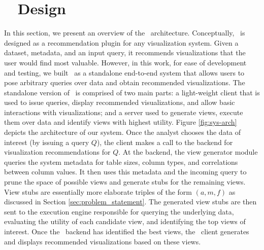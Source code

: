 

\section{{\large \SeeDB\ } Design}
\label{sec:system_architecture}

In this section, we present an overview of the \SeeDB\ architecture.
Conceptually, \SeeDB\ is designed as a recommendation plugin for any 
visualization system. Given a dataset, metadata, and an input query, 
it recommends visualizations that the user would find most valuable.
However, in this work, for ease of development and testing, we built 
\SeeDB\ as a standalone end-to-end system that allows users to pose 
arbitrary queries over data and obtain recommended visualizations.
The standalone version of \SeeDB\ is comprised of two main parts: 
a light-weight client that is 
used to issue queries, display recommended visualizations, and allow basic 
interactions with visualizations; and a server used to generate views, execute
them over data and identify views with highest utility. 
Figure \ref{fig:sys-arch} depicts the architecture of our system.
Once the analyst chooses the data of interest (by issuing a query $Q$), the
client makes a call to the backend for visualization recommendations for $Q$.
At the backend, the view generator module queries the system metadata for table sizes, 
column types, and correlations between column values. 
It then uses this metadata and the incoming query to prune the space
of possible views and generate stubs for the remaining views. 
View stubs are essentially more elaborate triples of the form $(a, m, f)$ as
discussed in Section \ref{sec:problem_statement}. 
The generated view stubs are then sent to the execution engine
responsible for querying the underlying data, evaluating the utility of each
candidate view, and identifying the top views of interest. 
Once the \SeeDB\ backend has identified the best views, the \SeeDB\
client generates and displays recommended visualizations based on these views. 

